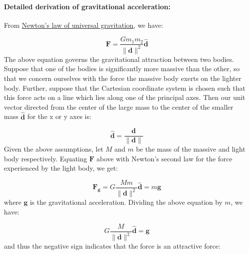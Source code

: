 \documentclass[12pt]{article}
\begin{document}
\paragraph{Detailed derivation of gravitational acceleration:}
\label{GD:accelGravityDeriv}
From \hyperref[TM:UniversalGravLaw]{Newton's law of universal gravitation}, we have:

\begin{displaymath}
\symbf{F}=\frac{G {m_{1}} {m_{2}}}{{\|\symbf{d}\|^{2}}} \symbf{\hat{d}}
\end{displaymath}
The above equation governs the gravitational attraction between two bodies. Suppose that one of the bodies is significantly more massive than the other, so that we concern ourselves with the force the massive body exerts on the lighter body. Further, suppose that the Cartesian coordinate system is chosen such that this force acts on a line which lies along one of the principal axes. Then our unit vector directed from the center of the large mass to the center of the smaller mass $\symbf{\hat{d}}$ for the x or y axes is:

\begin{displaymath}
\symbf{\hat{d}}=\frac{\symbf{d}}{\|\symbf{d}\|}
\end{displaymath}
Given the above assumptions, let $M$ and $m$ be the mass of the massive and light body respectively. Equating $\symbf{F}$ above with Newton's second law for the force experienced by the light body, we get:

\begin{displaymath}
{\symbf{F}_{\symbf{g}}}=G \frac{M m}{{\|\symbf{d}\|^{2}}} \symbf{\hat{d}}=m \symbf{g}
\end{displaymath}
where $\symbf{g}$ is the gravitational acceleration. Dividing the above equation by $m$,  we have:

\begin{displaymath}
G \frac{M}{{\|\symbf{d}\|^{2}}} \symbf{\hat{d}}=\symbf{g}
\end{displaymath}
and thus the negative sign indicates that the force is an attractive force:
\end{document}
